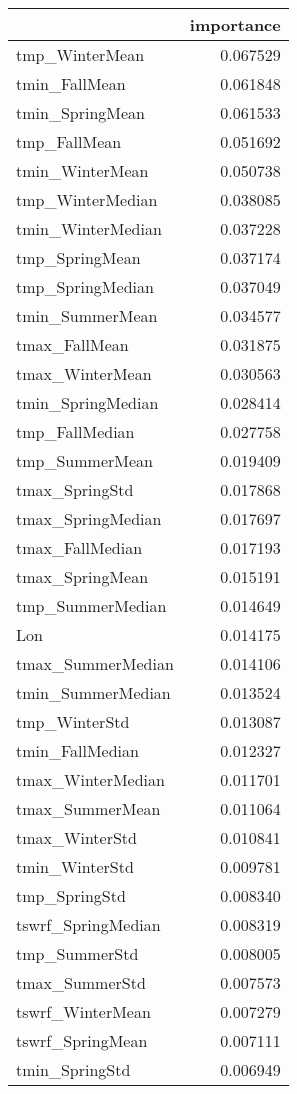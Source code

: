 \begin{tabular}{lr}
\toprule
 & importance \\
\midrule
tmp_WinterMean & 0.067529 \\
tmin_FallMean & 0.061848 \\
tmin_SpringMean & 0.061533 \\
tmp_FallMean & 0.051692 \\
tmin_WinterMean & 0.050738 \\
tmp_WinterMedian & 0.038085 \\
tmin_WinterMedian & 0.037228 \\
tmp_SpringMean & 0.037174 \\
tmp_SpringMedian & 0.037049 \\
tmin_SummerMean & 0.034577 \\
tmax_FallMean & 0.031875 \\
tmax_WinterMean & 0.030563 \\
tmin_SpringMedian & 0.028414 \\
tmp_FallMedian & 0.027758 \\
tmp_SummerMean & 0.019409 \\
tmax_SpringStd & 0.017868 \\
tmax_SpringMedian & 0.017697 \\
tmax_FallMedian & 0.017193 \\
tmax_SpringMean & 0.015191 \\
tmp_SummerMedian & 0.014649 \\
Lon & 0.014175 \\
tmax_SummerMedian & 0.014106 \\
tmin_SummerMedian & 0.013524 \\
tmp_WinterStd & 0.013087 \\
tmin_FallMedian & 0.012327 \\
tmax_WinterMedian & 0.011701 \\
tmax_SummerMean & 0.011064 \\
tmax_WinterStd & 0.010841 \\
tmin_WinterStd & 0.009781 \\
tmp_SpringStd & 0.008340 \\
tswrf_SpringMedian & 0.008319 \\
tmp_SummerStd & 0.008005 \\
tmax_SummerStd & 0.007573 \\
tswrf_WinterMean & 0.007279 \\
tswrf_SpringMean & 0.007111 \\
tmin_SpringStd & 0.006949 \\

\end{tabular}
